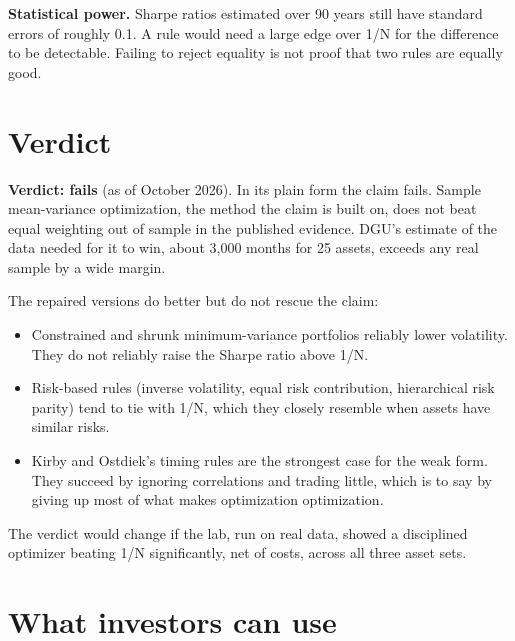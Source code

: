 \textbf{Statistical power.} Sharpe ratios estimated over 90 years still have standard errors of roughly 0.1. A rule would need a large edge over 1/N for the difference to be detectable. Failing to reject equality is not proof that two rules are equally good.

\section{Verdict}
\label{sec:12-verdict}

\begin{callout}
\textbf{Verdict: fails} (as of October 2026). In its plain form the claim fails. Sample mean-variance optimization, the method the claim is built on, does not beat equal weighting out of sample in the published evidence. DGU's estimate of the data needed for it to win, about 3,000 months for 25 assets, exceeds any real sample by a wide margin.
\end{callout}

The repaired versions do better but do not rescue the claim:

\begin{itemize}
  \item Constrained and shrunk minimum-variance portfolios reliably lower volatility. They do not reliably raise the Sharpe ratio above 1/N.
  \item Risk-based rules (inverse volatility, equal risk contribution, hierarchical risk parity) tend to tie with 1/N, which they closely resemble when assets have similar risks.
  \item Kirby and Ostdiek's timing rules are the strongest case for the weak form. They succeed by ignoring correlations and trading little, which is to say by giving up most of what makes optimization optimization.
\end{itemize}

The verdict would change if the lab, run on real data, showed a disciplined optimizer beating 1/N significantly, net of costs, across all three asset sets.

\section{What investors can use}
\label{sec:12-investors}

